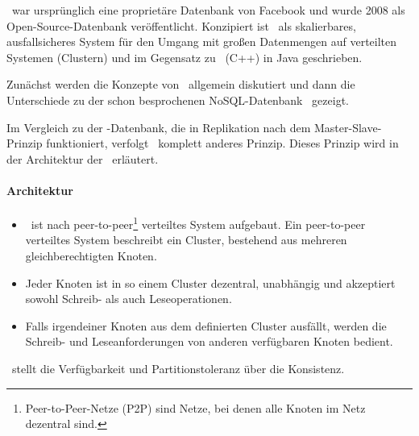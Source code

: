 \cass\ war ursprünglich eine proprietäre Datenbank von Facebook und wurde 2008 als Open-Source-Datenbank veröffentlicht. Konzipiert ist \cass\ als skalierbares, ausfallsicheres System für den Umgang mit großen Datenmengen auf verteilten Systemen (Clustern) und im Gegensatz zu \mongo\ (C++) in Java geschrieben.

Zunächst werden die Konzepte von \cass\ allgemein diskutiert und dann die Unterschiede zu der schon besprochenen NoSQL-Datenbank \mongo\ gezeigt.

Im Vergleich zu der \mongo-Datenbank, die in Replikation nach dem Master-Slave-Prinzip funktioniert, verfolgt \cass\ komplett anderes Prinzip. Dieses Prinzip wird in der Architektur der \cass\ erläutert.
\paragraph{Architektur}
\begin{itemize}
\item \cass\ ist nach peer-to-peer\footnote{Peer-to-Peer-Netze (P2P) sind Netze, bei denen alle Knoten im Netz dezentral sind.} verteiltes System aufgebaut. Ein peer-to-peer verteiltes System beschreibt ein Cluster, bestehend aus mehreren gleichberechtigten Knoten.  
\item Jeder Knoten ist in so einem Cluster dezentral, unabhängig und akzeptiert sowohl Schreib- als auch Leseoperationen.
\item Falls irgendeiner Knoten aus dem definierten Cluster ausfällt, werden die Schreib- und Leseanforderungen von anderen verfügbaren Knoten bedient.
\end{itemize}
\cass\ stellt die Verfügbarkeit und Partitionstoleranz über die Konsistenz.

